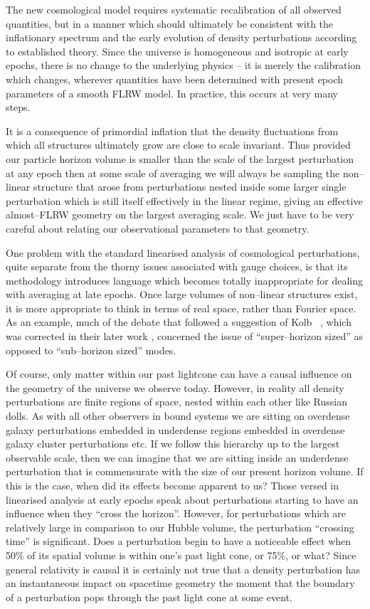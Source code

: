 \documentclass[12pt]{article}
\begin{document}
The new cosmological model requires systematic recalibration of all observed
quantities, but in a manner which should ultimately be consistent with the
inflationary spectrum and the early evolution of density perturbations
according to established theory. Since the universe is homogeneous
and isotropic at early epochs, there is no change to the underlying physics
-- it is merely the calibration which changes, wherever quantities have been
determined with present epoch parameters of a smooth FLRW model. In practice,
this occurs at very many steps.

It is a consequence of primordial inflation that the density fluctuations
from which all structures ultimately grow are close to scale invariant.
Thus provided our particle horizon volume is smaller than the scale of the
largest perturbation at any epoch then at some scale of averaging
we will always be sampling the non--linear structure that arose from
perturbations nested inside some larger single perturbation which is still
itself effectively in the linear regime, giving an effective almost--FLRW
geometry on the largest averaging scale. We just have to be very careful
about relating our observational parameters to that geometry.

One problem with the standard linearised analysis of cosmological
perturbations, quite separate from the thorny issues associated with
gauge choices, is that
its methodology introduces language which becomes totally inappropriate
for dealing with averaging at late epochs. Once large volumes of non--linear
structures exist, it is more appropriate to think in terms of real space,
rather than Fourier space. As an example, much of the debate that followed
a suggestion of Kolb \etal\ \cite{kolb1}, which was corrected in their
later work \cite{kolb2}, concerned the issue of ``super--horizon sized''
as opposed to ``sub--horizon sized'' modes.

Of course, only matter
within our past lightcone can have a causal influence on the geometry
of the universe we observe today. However, in reality all density
perturbations are finite regions of space, nested within each other
like Russian dolls.
As with all other observers in bound systems we are sitting on overdense
galaxy perturbations embedded in underdense regions embedded in overdense
galaxy cluster perturbations etc. If we follow this hierarchy up to the
largest observable scale, then we can imagine that we are sitting inside an
underdense perturbation that is commensurate with the size of our present
horizon volume. If this is the case, when did its effects become apparent to
us? Those versed in linearised analysis at early epochs speak about
perturbations starting to have an influence when they ``cross the
horizon''. However,
for perturbations which are relatively large in comparison to our Hubble
volume, the perturbation ``crossing time'' is significant. Does a
perturbation begin to have a noticeable effect when 50\% of its spatial
volume is within one's past light cone, or 75\%, or what? Since general
relativity is causal it is certainly not true that a density perturbation
has an instantaneous impact on spacetime geometry the moment that
the boundary of a perturbation pops through the past light cone at some event.
\end{document}
